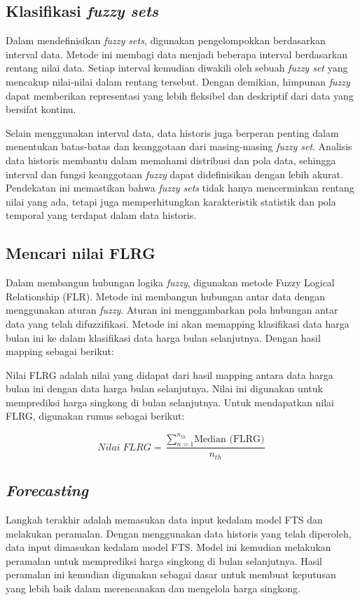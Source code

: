 \documentclass[conference]{IEEEtran}
\begin{document}
\subsection{Klasifikasi \textit{fuzzy sets}}
Dalam mendefinisikan \textit{fuzzy sets}, digunakan pengelompokkan berdasarkan interval data. Metode ini membagi data menjadi beberapa interval berdasarkan rentang nilai data. Setiap interval kemudian diwakili oleh sebuah \textit{fuzzy set} yang mencakup nilai-nilai dalam rentang tersebut. Dengan demikian, himpunan \textit{fuzzy} dapat memberikan representasi yang lebih fleksibel dan deskriptif dari data yang bersifat kontinu.

Selain menggunakan interval data, data historis juga berperan penting dalam menentukan batas-batas dan keanggotaan dari masing-masing \textit{fuzzy set}. Analisis data historis membantu dalam memahami distribusi dan pola data, sehingga interval dan fungsi keanggotaan \textit{fuzzy} dapat didefinisikan dengan lebih akurat. Pendekatan ini memastikan bahwa \textit{fuzzy sets} tidak hanya mencerminkan rentang nilai yang ada, tetapi juga memperhitungkan karakteristik statistik dan pola temporal yang terdapat dalam data historis.

\subsection{Mencari nilai FLRG}
Dalam membangun hubungan logika \textit{fuzzy}, digunakan metode Fuzzy Logical Relationship (FLR). Metode ini membangun hubungan antar data dengan menggunakan aturan \textit{fuzzy}. Aturan ini menggambarkan pola hubungan antar data yang telah difuzzifikasi. Metode ini akan memapping klasifikasi data harga bulan ini ke dalam klasifikasi data harga bulan selanjutnya. Dengan hasil mapping sebagai berikut:

Nilai FLRG adalah nilai yang didapat dari hasil mapping antara data harga bulan ini dengan data harga bulan selanjutnya. Nilai ini digunakan untuk memprediksi harga singkong di bulan selanjutnya.
Untuk mendapatkan nilai FLRG, digunakan rumus sebagai berikut:
    
\begin{equation}
        Nilai\; FLRG = \frac{\sum_{n=1}^{n_{th}} \text{Median (FLRG)}}{n_{th}}
    \end{equation}
    
\subsection{\textit{Forecasting}}
Langkah terakhir adalah memasukan data input kedalam model FTS dan melakukan peramalan. Dengan menggunakan data historis yang telah diperoleh, data input dimasukan kedalam model FTS. Model ini kemudian melakukan peramalan untuk memprediksi harga singkong di bulan selanjutnya. Hasil peramalan ini kemudian digunakan sebagai dasar untuk membuat keputusan yang lebih baik dalam merencanakan dan mengelola harga singkong. 
\end{document}
